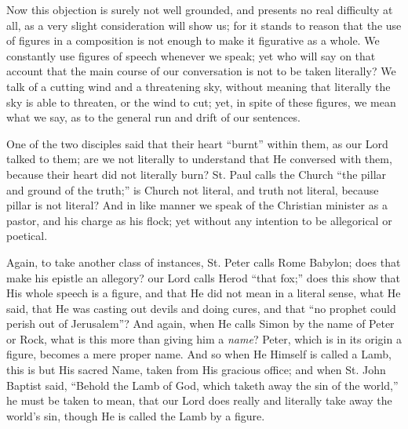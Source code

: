 Now this objection is surely not well grounded, and presents no
real difficulty at all, as a very slight consideration will show us;
for it stands to reason that the use of figures in a composition is
not enough to make it figurative as a whole. We constantly use figures
of speech whenever we speak; yet who will say on that account that the
main course of our conversation is not to be taken literally? We talk
of a cutting wind and a threatening sky, without meaning that
literally the sky is able to threaten, or the wind to cut; yet, in
spite of these figures, we mean what we say, as to the general run and
drift of our sentences.

One of the two disciples said that their heart ``burnt''
within them, as our Lord talked to them; are we not literally to
understand that He conversed with them, because their heart did not
literally burn? St. Paul calls the Church ``the pillar and ground
of the truth;'' is Church not literal, and truth not literal,
because pillar is not literal? And in like manner we speak of the
Christian minister as a pastor, and his charge as his flock; yet
without any intention to be allegorical or poetical.

Again, to take another class of instances, St. Peter calls Rome
Babylon; does that make his epistle an allegory? our Lord calls Herod
``that fox;'' does this show that His whole speech is a
figure, and that He did not mean in a literal sense, what He said,
that He was casting out devils and doing cures, and that ``no
prophet could perish out of Jerusalem''? And again, when He calls
Simon by the name of Peter or Rock, what is this more than giving him
a \emph{name}? Peter, which is in its origin a figure, becomes a mere
proper name. And so when He Himself is called a Lamb, this is but His
sacred Name, taken from His gracious office; and when St. John Baptist
said, ``Behold the Lamb of God, which taketh away the sin of the
world,'' he must be taken to mean, that our Lord does really and
literally take away the world's sin, though He is called the Lamb by a
figure.

